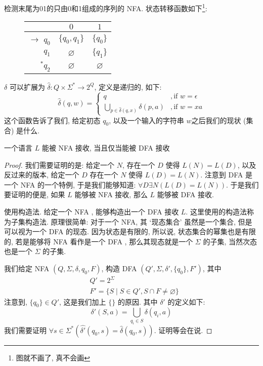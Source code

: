 \documentclass[../main_part1.tex]{subfiles}
\begin{document}
\begin{exam}
检测末尾为01的只由0和1组成的序列的 NFA. 状态转移函数如下\footnote{图就不画了, 真不会画}: 
\begin{figure}[h]
\centering
\begin{tabular}{|r|cc|}
\hline
& \(0\) & \(1\) \\ 
\hline 
$\to$ \(q_{0}\) & \(\{ q_{0}, q_{1}\}\) & \(\{q_{0}\}\)\\ 
\(q_{1	}\) & $\varnothing$ & \(\{q_{1} \}\) \\
\(^{*}q_{2}\) & $\varnothing$ & $\varnothing$\\
\hline
\end{tabular}
\end{figure}

\end{exam}
\begin{definition}[状态转移函数的拓展]
\(\delta\) 可以扩展为 \(\hat{\delta}\colon Q \times \Sigma ^{*} \to 2^{Q}\), 定义是递归的, 如下:
\[
\hat{\delta}(q, w) = 
\begin{cases}
q &, \text{if } w = \epsilon \\
\bigcup_{p\in \hat{\delta}(q,x)} \delta(p,a) & , \text{if } w = xa
\end{cases}
\]
这个函数告诉了我们, 给定初态 \(q_{0}\), 以及一个输入的字符串 \(w\)之后我们的现状 (集合) 是什么. 
\end{definition}
\begin{thm}[NFA和DFA之间的等价性]\label{Thm:nfa=dfa}
一个语言 \(L\) 能被 NFA 接收, 当且仅当能被 DFA 接收
\end{thm}
\begin{proof}
我们需要证明的是: 给定一个 \(N\), 存在一个 \(D\) 使得 \(L (N) = L (D) \), 以及反过来的版本, 给定一个 \(D\) 存在一个 \(N\) 使得 \(L (D) = L(N)\).
注意到 DFA 是一个 NFA 的一个特例, 于是我们能够知道: \(\forall D \exists N (L(D) = L(N)) \). 于是我们要证明的便是, 如果 \(L\) 能够被 NFA 接收, 那么 \(L\) 能够被 DFA 接收. 

使用构造法. 给定一个 NFA , 能够构造出一个 DFA 接收 \(L\). 这里使用的构造法称为子集构造法. 原理很简单: 对于一个 NFA, 其 `现态集合' 虽然是一个集合, 但是可以视为一个 DFA 的现态. 因为状态是有限的, 所以说, 状态集合的幂集也是有限的, 若是能够将 NFA 看作是一个 DFA , 那么其现态就是一个 \(\Sigma\) 的子集, 当然次态也是一个 \(\Sigma\) 的子集. 

我们给定 NFA \((Q,\Sigma,\delta, q_{0},F)\), 构造 DFA \((Q' , \Sigma, \delta ' , \{q_{0}\}, F')\), 其中 
\[
\begin{aligned}
& Q '  =  2 ^{\Sigma} \\ 
& F' = \{ S \mid S \in Q ', S \cap F  \ne \varnothing \}
\end{aligned}
\]
注意到, \(\{q_{0}\}\in Q'\), 这是我们加上 \(\{\}\) 的原因. 其中 \(\delta '\) 的定义如下: 
\[
\delta ' (S, a) = \bigcup_{q_{i} \in S} \delta (q_{i}, a) 
\]
我们需要证明 \(\forall s \in \Sigma ^{*} (\hat{\delta'} (q_{0}, s) = \hat{\delta} (q_{0},s))\). 证明等会在说. 
\end{proof}
\end{document}
